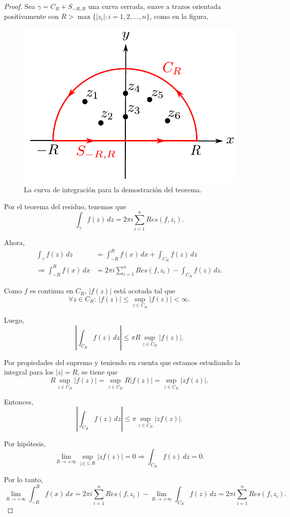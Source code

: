 \begin{proof}
Sea $\gamma = C_R + S_{-R,R}$ una curva cerrada, suave a trazos orientada positivamente con $R > \max\{|z_i| : i = 1,2, \dots, n\}$, como en la figura,

\begin{figure}[H]
    \centering
    \includegraphics[scale = 0.6]{Figuras/IntegralImpropia2.pdf}
    \caption{La curva de integración para la demostración del teorema.}
    \label{fig:IntegralImpropia2}
\end{figure}

Por el teorema del residuo, tenemos que
$$\int_{\gamma} f(z)\,dz = 2\pi i \sum_{i=1}^n Res(f,z_i).$$

Ahora, 
\begin{align*}
    \int_{\gamma} f(z) \,dz &= \int_{-R}^R f(x) \,dx + \int_{C_R} f(z) \,dz \\
    \Rightarrow \int_{-R}^R f(x) \,dx &=  2\pi i \sum_{i=1}^n Res(f,z_i) - \int_{C_R} f(z) \,dz.
\end{align*}

Como $f$ es continua en $C_R$, $|f(z)|$ está acotada tal que
$$\forall z \in C_R: ~ |f(z)| \leq \sup_{z \in C_R} |f(z)| < \infty.$$

Luego,
$$\left| \int_{C_R} f(z) \,dz \right| \leq \pi R \sup_{z \in C_R} |f(z)|.$$

Por propiedades del supremo y teniendo en cuenta que estamos estudiando la integral para los $|z| = R$, se tiene que
$$R \sup_{z \in C_R} |f(z)| = \sup_{z \in C_R} R |f(z)| =\sup_{z \in C_R} |z f(z)|.$$

Entonces,
$$\left| \int_{C_R} f(z) \,dz \right| \leq \pi \sup_{z \in C_R} |zf(z)|.$$

Por hipótesis,
$$\lim_{R\to + \infty} \sup_{|z| \leq R} |zf(z)| = 0  \Rightarrow  \int_{C_R} f(z) \,dz  = 0.$$

Por lo tanto,
$$\lim_{R \to + \infty} \int_{-R}^R f(x) \,dx = 2\pi i \sum_{i=1}^n Res(f,z_i) - \lim_{R\to + \infty} \int_{C_R} f(z) \,dz = 2\pi i \sum_{i=1}^n Res(f,z_i).$$
\end{proof}

